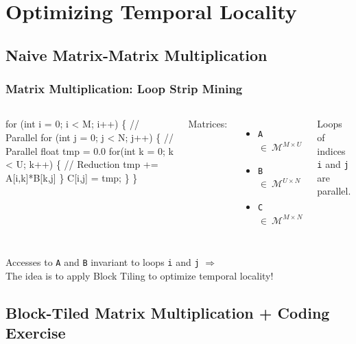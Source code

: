 \documentclass{beamer}
\renewcommand{\emph}[1]{\textcolor{CosGreen}{ #1}}
\newcommand{\emp}[1]{\textcolor{DikuRed}{ #1}}
\newcommand{\emphh}[1]{\textcolor{CosGreen}{ #1}}
\begin{document}
\section{Optimizing Temporal Locality}

\begin{frame}[fragile]
	\tableofcontents[currentsection]
\end{frame}

\subsection{Naive Matrix-Matrix Multiplication}

\begin{frame}[fragile,t]
  \frametitle{Matrix Multiplication: Loop Strip Mining}

\begin{columns}
\begin{colorcode}[fontsize=\scriptsize]
for (int i = 0; i < M; i++) \{  \emphh{// Parallel}
  for (int j = 0; j < N; j++) \{  \emphh{// Parallel}
    float tmp = 0.0
    for(int k = 0; k < U; k++) \{ \emp{// Reduction}
      tmp += A[i,k]*B[k,j] 
    \}
    C[i,j] = tmp;          
  \}
\}
\end{colorcode}
Matrices:
\begin{itemize}
    \item {\tt A $\in~\mathcal{M}^{M \times U}$}
    \item {\tt B $\in~\mathcal{M}^{U \times N}$}
    \item {\tt C$\in~\mathcal{M}^{M \times N}$} 
\end{itemize}
Loops of indices {\tt i} and {\tt j} are parallel.
\end{columns}

\bigskip

Accesses to {\tt A} and {\tt B} invariant to loops {\tt i} and {\tt j} $\Rightarrow$\\
\emph{The idea is to apply Block Tiling to optimize temporal locality!}  
\end{frame}

\subsection{Block-Tiled Matrix Multiplication + Coding Exercise}
\end{document}
